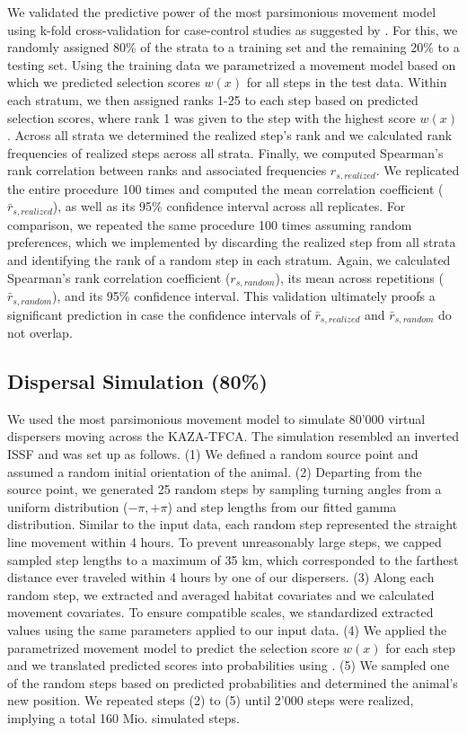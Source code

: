 \documentclass[abstract=on,10pt,a4paper,bibliography=totocnumbered]{article}
\begin{document}
We validated the predictive power of the most parsimonious movement model using
k-fold cross-validation for case-control studies as suggested by
\cite{Fortin.2009}. For this, we randomly assigned 80\% of the strata to a
training set and the remaining 20\% to a testing set. Using the training data we
parametrized a movement model based on which we predicted selection scores
\(w(x)\) for all steps in the test data. Within each stratum, we then assigned
ranks 1-25 to each step based on predicted selection scores, where rank 1 was
given to the step with the highest score \(w(x)\). Across all strata we
determined the realized step's rank and we calculated rank frequencies of
realized steps across all strata. Finally, we computed Spearman's rank
correlation between ranks and associated frequencies \(r_{s, realized}\). We
replicated the entire procedure 100 times and computed the mean correlation
coefficient (\(\bar{r}_{s, realized}\)), as well as its 95\% confidence interval
across all replicates. For comparison, we repeated the same procedure 100 times
assuming random preferences, which we implemented by discarding the realized
step from all strata and identifying the rank of a random step in each stratum.
Again, we calculated Spearman's rank correlation coefficient (\(r_{s,
random}\)), its mean across repetitions (\(\bar{r}_{s, random}\)), and its 95\%
confidence interval. This validation ultimately proofs a significant prediction
in case the confidence intervals of \(\bar{r}_{s, realized}\) and \(\bar{r}_{s,
random}\) do not overlap.

\subsection{Dispersal Simulation (80\%)}
We used the most parsimonious movement model to simulate 80'000 virtual
dispersers moving across the KAZA-TFCA. The simulation resembled an inverted
ISSF and was set up as follows. (1) We defined a random source point and assumed
a random initial orientation of the animal. (2) Departing from the source point,
we generated 25 random steps by sampling turning angles from a uniform
distribution (\(-\pi, +\pi\)) and step lengths from our fitted gamma
distribution. Similar to the input data, each random step represented the
straight line movement within 4 hours. To prevent unreasonably large steps, we
capped sampled step lengths to a maximum of 35 km, which corresponded to the
farthest distance ever traveled within 4 hours by one of our dispersers. (3)
Along each random step, we extracted and averaged habitat covariates and we
calculated movement covariates. To ensure compatible scales, we standardized
extracted values using the same parameters applied to our input data. (4) We
applied the parametrized movement model to predict the selection score \(w(x)\)
for each step and we translated predicted scores into probabilities using
. (5) We sampled one of the random steps based on predicted
probabilities and determined the animal's new position. We repeated steps (2) to
(5) until 2'000 steps were realized, implying a total 160 Mio. simulated steps.
\end{document}
